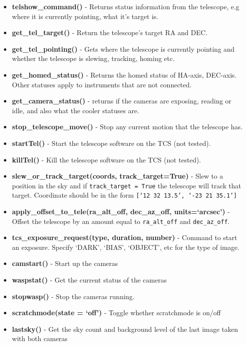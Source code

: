 \documentclass[a4paper,12pt]{article}
\begin{document}
{\begin{itemize}
\item{{\bf telshow\_command()} - Returns status information from the telescope, e.g where it is currently pointing, what it's target is.}
\item{{\bf get\_tel\_target()} - Return the telescope's target RA and DEC.}
\item{{\bf get\_tel\_pointing()} - Gets where the telescope is currently pointing and whether the telescope is slewing, tracking, homing etc.}
\item{{\bf get\_homed\_status()} - Returns the homed status of HA-axis, DEC-axis. Other statuses apply to instruments that are not connected.}
\item{{\bf get\_camera\_status()} - returns if the cameras are exposing, reading or idle, and also what the cooler statuses are.}
\item{{\bf stop\_telescope\_move()} - Stop any current motion that the telescope has.}
\item{{\bf startTel()} - Start the telescope software on the TCS (not tested).}
\item{{\bf killTel()} - Kill the telescope software on the TCS (not tested).}
\item{{\bf slew\_or\_track\_target(coords, track\_target=True)} - Slew to a position in the sky and if {\tt track\_target = True} the telescope will track that target. Coordinate should be in the form {\tt [`12 32 13.5', `-23 21 35.1']} }
\item{{\bf apply\_offset\_to\_tele(ra\_alt\_off, dec\_az\_off, units=`arcsec')} - Offset the telescope by an amount equal to {\tt ra\_alt\_off} and {\tt dec\_az\_off}.}
\item{{\bf tcs\_exposure\_request(type, duration, number)} - Command to start an exposure. Specify `DARK', `BIAS', `OBJECT', etc for the type of image.}
\item{{\bf camstart()} - Start up the cameras}
\item{{\bf waspstat()} -  Get the current status of the cameras}
\item{{\bf stopwasp()} - Stop the cameras running.}
\item{{\bf scratchmode(state = `off')} - Toggle whether scratchmode is on/off}
\item{{\bf lastsky()} - Get the sky count and background level of the last image taken with both cameras}
\end{itemize}





}
\end{document}
